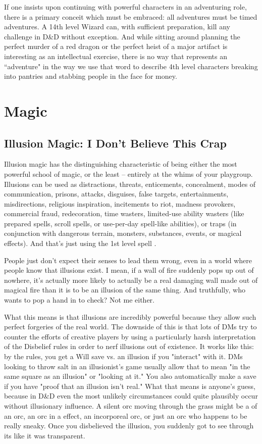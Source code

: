 If one insists upon continuing with powerful characters in an adventuring role, there is a primary conceit which must be embraced: all adventures must be timed adventures. A 14th level Wizard can, with sufficient preparation, kill any challenge in D\&D without exception. And while sitting around planning the perfect murder of a red dragon or the perfect heist of a major artifact is interesting as an intellectual exercise, there is no way that represents an ``adventure" in the way we use that word to describe 4th level characters breaking into pantries and stabbing people in the face for money.


\section{Magic}

\subsection{Illusion Magic: I Don't Believe This Crap}

Illusion magic has the distinguishing characteristic of being either the most powerful school of magic, or the least -- entirely at the whims of your playgroup. Illusions can be used as distractions, threats, enticements, concealment, modes of communication, prisons, attacks, disguises, false targets, entertainments, misdirections, religious inspiration, incitements to riot, madness provokers, commercial fraud, redecoration, time wasters, limited-use ability wasters (like prepared spells, scroll spells, or use-per-day spell-like abilities), or traps (in conjunction with dangerous terrain, monsters, substances, events, or magical effects). And that's just using the 1st level spell .

People just don't expect their senses to lead them wrong, even in a world where people know that illusions exist. I mean, if a wall of fire suddenly pops up out of nowhere, it's actually more likely to actually be a real damaging wall made out of magical fire than it is to be an illusion of the same thing. And truthfully, who wants to pop a hand in to check? Not me either.

What this means is that illusions are incredibly powerful because they allow such perfect forgeries of the real world. The downside of this is that lots of DMs try to counter the efforts of creative players by using a particularly harsh interpretation of the Disbelief rules in order to nerf illusions out of existence. It works like this: by the rules, you get a Will save vs. an illusion if you "interact" with it. DMs looking to throw salt in an illusionist's game usually allow that to mean "in the same square as an illusion" or "looking at it." You also automatically make a save if you have "proof that an illusion isn't real." What that means is anyone's guess, because in D\&D even the most unlikely circumstances could quite plausibly occur without illusionary influence. A silent orc moving through the grass might be a  of an orc, an orc in a  effect, an incorporeal orc, or just an orc who happens to be really sneaky. Once you disbelieved the illusion, you suddenly got to see through its like it was transparent.

